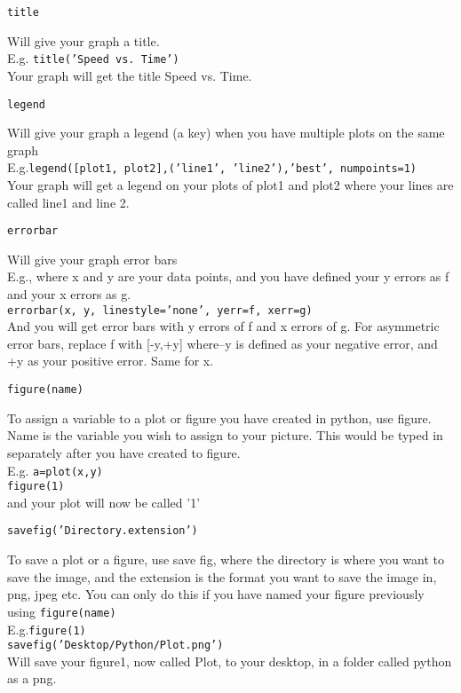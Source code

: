 \noindent \texttt{title}
\begin{myindentpar}{1.4cm}
\vspace*{-1ex}
Will give your graph a title.\\
E.g. \texttt{title('Speed vs. Time')}\\
Your graph will get the title Speed vs. Time.
\end{myindentpar}

\noindent \texttt{legend}
\begin{myindentpar}{1.4cm}
\vspace*{-1ex}
Will give your graph a legend (a key) when you have multiple plots on the same graph\\
E.g.\texttt{legend([plot1, plot2],('line1', 'line2'),'best', numpoints=1)}\\
Your graph will get a legend on your plots of plot1 and plot2 where your lines are called line1 and line 2.
\end{myindentpar}

\noindent \texttt{errorbar}
\begin{myindentpar}{1.4cm}
\vspace*{-1ex}
Will give your graph error bars\\
E.g., where x and y are your data points, and you have defined your y errors as f and your x errors as g.\\
\texttt{errorbar(x, y, linestyle='none',  yerr=f,  xerr=g)}\\
And you will get error bars with y errors of f and x errors of g.
For asymmetric error bars, replace f with [-y,+y] where–y is defined as your negative error, and +y as your positive error. Same for x. 
\end{myindentpar}

\noindent \texttt{figure(name)}
\begin{myindentpar}{1.4cm}
\vspace*{-1ex}
To assign a variable to a plot or figure you have created in python, use figure. Name is the variable you wish to assign to your picture. This would be typed in separately after you have created to figure.                \\
E.g. \texttt{a=plot(x,y)}\\
\texttt{figure(1)}\\
and your plot will now be called '1'
\end{myindentpar}

\newpage
\noindent \texttt{savefig('Directory.extension')}
\begin{myindentpar}{1.4cm}
\vspace*{-1ex} 
To save a plot or a figure, use save fig, where the directory is where you want to save the image, and the extension is the format you want to save the image in, png, jpeg etc. You can only do this if you have named your figure previously using \texttt{figure(name)}\\
E.g.\texttt{figure(1)}\\
\texttt{savefig('Desktop/Python/Plot.png')}\\
Will save your figure1, now called Plot, to your desktop, in a folder called python as a png.
\end{myindentpar}

